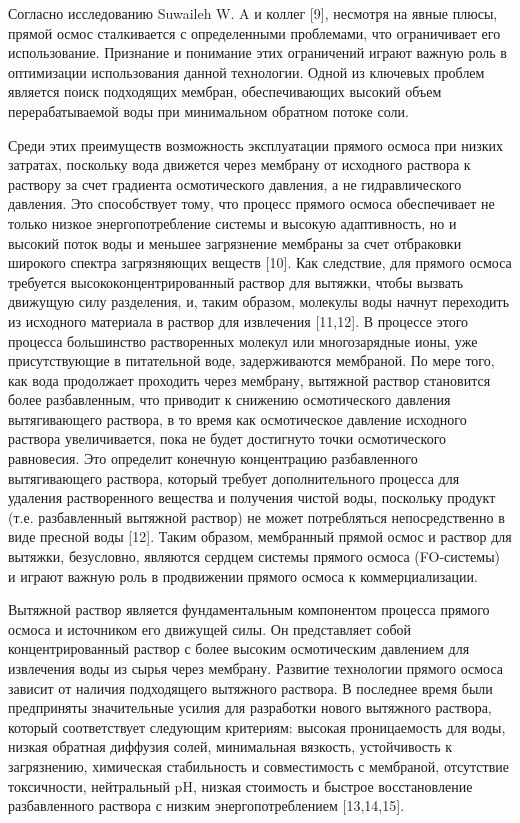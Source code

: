 \begin{multicols}{2}
Согласно исследованию Suwaileh W. A и коллег {[}9{]}, несмотря на явные
плюсы, прямой осмос сталкивается с определенными проблемами, что
ограничивает его использование. Признание и понимание этих ограничений
играют важную роль в оптимизации использования данной технологии. Одной
из ключевых проблем является поиск подходящих мембран, обеспечивающих
высокий объем перерабатываемой воды при минимальном обратном потоке
соли.

Среди этих преимуществ возможность эксплуатации прямого осмоса при
низких затратах, поскольку вода движется через мембрану от исходного
раствора к раствору за счет градиента осмотического давления, а не
гидравлического давления. Это способствует тому, что процесс прямого
осмоса обеспечивает не только низкое энергопотребление системы и высокую
адаптивность, но и высокий поток воды и меньшее загрязнение мембраны за
счет отбраковки широкого спектра загрязняющих веществ {[}10{]}. Как
следствие, для прямого осмоса требуется высококонцентрированный раствор
для вытяжки, чтобы вызвать движущую силу разделения, и, таким образом,
молекулы воды начнут переходить из исходного материала в раствор для
извлечения {[}11,12{]}. В процессе этого процесса большинство
растворенных молекул или многозарядные ионы, уже присутствующие в
питательной воде, задерживаются мембраной. По мере того, как вода
продолжает проходить через мембрану, вытяжной раствор становится более
разбавленным, что приводит к снижению осмотического давления
вытягивающего раствора, в то время как осмотическое давление исходного
раствора увеличивается, пока не будет достигнуто точки осмотического
равновесия. Это определит конечную концентрацию разбавленного
вытягивающего раствора, который требует дополнительного процесса для
удаления растворенного вещества и получения чистой воды, поскольку
продукт (т.е. разбавленный вытяжной раствор) не может потребляться
непосредственно в виде пресной воды {[}12{]}. Таким образом, мембранный
прямой осмос и раствор для вытяжки, безусловно, являются сердцем системы
прямого осмоса (FO-системы) и играют важную роль в продвижении прямого
осмоса к коммерциализации.

Вытяжной раствор является фундаментальным компонентом процесса прямого
осмоса и источником его движущей силы. Он представляет собой
концентрированный раствор с более высоким осмотическим давлением для
извлечения воды из сырья через мембрану. Развитие технологии прямого
осмоса зависит от наличия подходящего вытяжного раствора. В последнее
время были предприняты значительные усилия для разработки нового
вытяжного раствора, который соответствует следующим критериям: высокая
проницаемость для воды, низкая обратная диффузия солей, минимальная
вязкость, устойчивость к загрязнению, химическая стабильность и
совместимость с мембраной, отсутствие токсичности, нейтральный pH,
низкая стоимость и быстрое восстановление разбавленного раствора с
низким энергопотреблением {[}13,14,15{]}.


\end{multicols}
